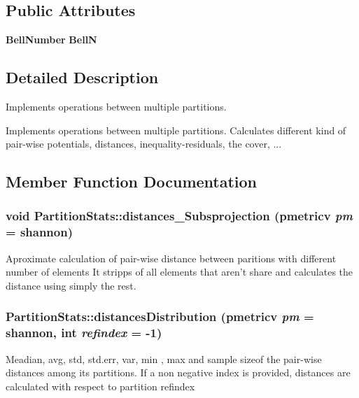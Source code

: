 \subsection*{Public Attributes}
\begin{CompactItemize}
\item 
{\bf Bell\-Number} {\bf Bell\-N}\label{classPartitionStats_o0}

\end{CompactItemize}


\subsection{Detailed Description}
Implements operations between multiple partitions. 

Implements operations between multiple partitions. Calculates different kind of pair-wise potentials, distances, inequality-residuals, the cover, ... 



\subsection{Member Function Documentation}
\subsubsection{\setlength{\rightskip}{0pt plus 5cm}void Partition\-Stats::distances\_\-Subsprojection (pmetricv {\em pm} = shannon)}\label{classPartitionStats_a45}


Aproximate calculation of pair-wise distance between paritions with different number of elements It stripps of all elements that aren't share and calculates the distance using simply the rest. 
\subsubsection{ Partition\-Stats::distances\-Distribution (pmetricv {\em pm} = shannon, int {\em refindex} = -1)}\label{classPartitionStats_a44}


Meadian, avg, std, std.err, var, min , max and sample sizeof the pair-wise distances among its partitions. If a non negative index is provided, distances are calculated with respect to partition refindex
